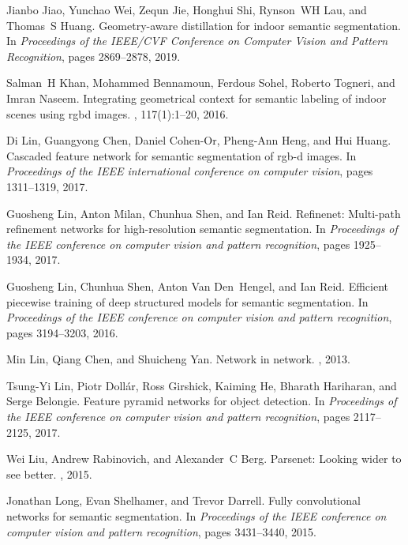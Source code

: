 \documentclass[10pt,twocolumn,letterpaper]{article}
\begin{document}
\begin{thebibliography}{10}
Jianbo Jiao, Yunchao Wei, Zequn Jie, Honghui Shi, Rynson~WH Lau, and Thomas~S
  Huang.
\newblock Geometry-aware distillation for indoor semantic segmentation.
\newblock In {\em Proceedings of the IEEE/CVF Conference on Computer Vision and
  Pattern Recognition}, pages 2869--2878, 2019.

Salman~H Khan, Mohammed Bennamoun, Ferdous Sohel, Roberto Togneri, and Imran
  Naseem.
\newblock Integrating geometrical context for semantic labeling of indoor
  scenes using rgbd images.
, 117(1):1--20, 2016.

Di Lin, Guangyong Chen, Daniel Cohen-Or, Pheng-Ann Heng, and Hui Huang.
\newblock Cascaded feature network for semantic segmentation of rgb-d images.
\newblock In {\em Proceedings of the IEEE international conference on computer
  vision}, pages 1311--1319, 2017.

Guosheng Lin, Anton Milan, Chunhua Shen, and Ian Reid.
\newblock Refinenet: Multi-path refinement networks for high-resolution
  semantic segmentation.
\newblock In {\em Proceedings of the IEEE conference on computer vision and
  pattern recognition}, pages 1925--1934, 2017.

Guosheng Lin, Chunhua Shen, Anton Van Den~Hengel, and Ian Reid.
\newblock Efficient piecewise training of deep structured models for semantic
  segmentation.
\newblock In {\em Proceedings of the IEEE conference on computer vision and
  pattern recognition}, pages 3194--3203, 2016.

Min Lin, Qiang Chen, and Shuicheng Yan.
\newblock Network in network.
, 2013.

Tsung-Yi Lin, Piotr Doll{\'a}r, Ross Girshick, Kaiming He, Bharath Hariharan,
  and Serge Belongie.
\newblock Feature pyramid networks for object detection.
\newblock In {\em Proceedings of the IEEE conference on computer vision and
  pattern recognition}, pages 2117--2125, 2017.

Wei Liu, Andrew Rabinovich, and Alexander~C Berg.
\newblock Parsenet: Looking wider to see better.
, 2015.

Jonathan Long, Evan Shelhamer, and Trevor Darrell.
\newblock Fully convolutional networks for semantic segmentation.
\newblock In {\em Proceedings of the IEEE conference on computer vision and
  pattern recognition}, pages 3431--3440, 2015.


\end{thebibliography}
\end{document}
